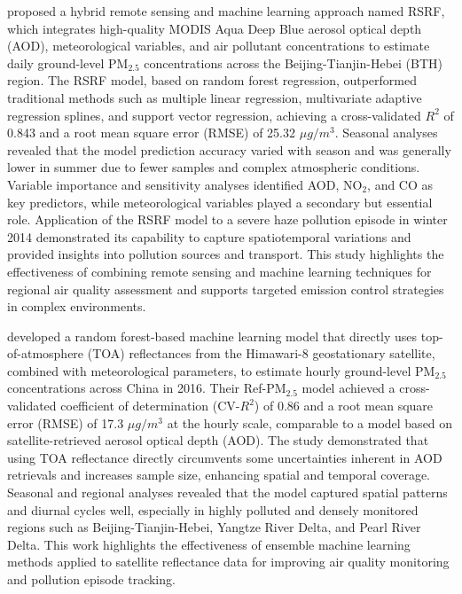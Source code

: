 \documentclass[11pt]{article}
\begin{document}
\citet{li2019predicting} proposed a hybrid remote sensing and machine learning approach named RSRF, which integrates high-quality MODIS Aqua Deep Blue aerosol optical depth (AOD), meteorological variables, and air pollutant concentrations to estimate daily ground-level PM$_{2.5}$ concentrations across the Beijing-Tianjin-Hebei (BTH) region. The RSRF model, based on random forest regression, outperformed traditional methods such as multiple linear regression, multivariate adaptive regression splines, and support vector regression, achieving a cross-validated \( R^2 \) of 0.843 and a root mean square error (RMSE) of 25.32 \(\mu g/m^3\). Seasonal analyses revealed that the model prediction accuracy varied with season and was generally lower in summer due to fewer samples and complex atmospheric conditions. Variable importance and sensitivity analyses identified AOD, NO$_2$, and CO as key predictors, while meteorological variables played a secondary but essential role. Application of the RSRF model to a severe haze pollution episode in winter 2014 demonstrated its capability to capture spatiotemporal variations and provided insights into pollution sources and transport. This study highlights the effectiveness of combining remote sensing and machine learning techniques for regional air quality assessment and supports targeted emission control strategies in complex environments.

\citet{liu2019satellite} developed a random forest-based machine learning model that directly uses top-of-atmosphere (TOA) reflectances from the Himawari-8 geostationary satellite, combined with meteorological parameters, to estimate hourly ground-level PM$_{2.5}$ concentrations across China in 2016. Their Ref-PM$_{2.5}$ model achieved a cross-validated coefficient of determination (CV-$R^2$) of 0.86 and a root mean square error (RMSE) of 17.3 \(\mu g/m^{3}\) at the hourly scale, comparable to a model based on satellite-retrieved aerosol optical depth (AOD). The study demonstrated that using TOA reflectance directly circumvents some uncertainties inherent in AOD retrievals and increases sample size, enhancing spatial and temporal coverage. Seasonal and regional analyses revealed that the model captured spatial patterns and diurnal cycles well, especially in highly polluted and densely monitored regions such as Beijing-Tianjin-Hebei, Yangtze River Delta, and Pearl River Delta. This work highlights the effectiveness of ensemble machine learning methods applied to satellite reflectance data for improving air quality monitoring and pollution episode tracking.
\end{document}
